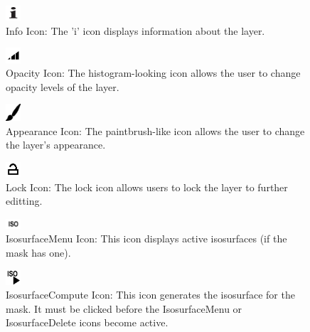 \documentclass[fleqn,11pt,openany]{book}
\begin{document}
\begin{figure}[h!]
  \includegraphics[width=0.05\textwidth]{Seg3DTutorial_figures/InfoOff.png}%
  \caption{Info Icon: The 'i' icon displays information about the layer.}
\end{figure}

\begin{figure}[h!]
  \includegraphics[width=0.05\textwidth]{Seg3DTutorial_figures/OpacityOff.png}%
  \caption{Opacity Icon: The histogram-looking icon allows the user to change opacity levels of the layer.}
\end{figure}

\begin{figure}[h!]
  \includegraphics[width=0.05\textwidth]{Seg3DTutorial_figures/AppearanceOff.png}%
  \caption{Appearance Icon: The paintbrush-like icon allows the user to change the layer's appearance.}
\end{figure}

\begin{figure}[h!]
  \includegraphics[width=0.05\textwidth]{Seg3DTutorial_figures/LockOff.png}%
  \caption{Lock Icon: The lock icon allows users to lock the layer to further editting.}
\end{figure}

\begin{figure}[h!]
  \includegraphics[width=0.05\textwidth]{Seg3DTutorial_figures/IsosurfaceMenuOff.png}%
  \caption{IsosurfaceMenu Icon: This icon displays active isosurfaces (if the mask has one).}
\end{figure}

\begin{figure}[h!]
  \includegraphics[width=0.05\textwidth]{Seg3DTutorial_figures/IsosurfaceComputeOff.png}%
  \caption{IsosurfaceCompute Icon: This icon generates the isosurface for the mask.  It must be clicked before the IsosurfaceMenu or IsosurfaceDelete icons become active.}
\end{figure}
\end{document}
